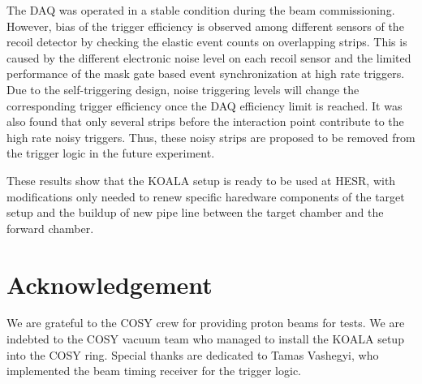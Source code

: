 \documentclass[number,5p]{elsarticle}
\begin{document}
The DAQ was operated in a stable condition during the beam commissioning.
However, bias of the trigger efficiency is observed among different
sensors of the recoil detector by checking the elastic event counts on overlapping strips.
This is caused by the different electronic noise level on each recoil sensor and
the limited performance of the mask gate based event synchronization at high
rate triggers.
Due to the self-triggering design, noise triggering levels will change
the corresponding trigger efficiency once the DAQ efficiency limit is reached.
It was also found that only several strips before the interaction point
contribute to the high rate noisy triggers.
Thus, these noisy strips are proposed to be removed from the trigger logic in the future experiment.

These results show that the KOALA setup is ready to be used at HESR, with modifications only needed
to renew specific haredware components of the target setup and the buildup of new pipe line between the
target chamber and the forward chamber.

\section{Acknowledgement}
\label{sec:acknowledgement}
We are grateful to the COSY crew for providing proton beams for tests.
We are indebted to the COSY vacuum team who managed to install the KOALA
setup into the COSY ring. Special thanks are dedicated to Tamas
Vashegyi, who implemented the beam timing receiver for the trigger logic.



\end{document}
